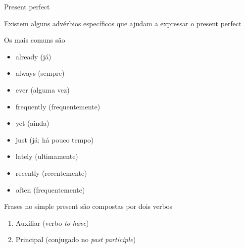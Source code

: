 \documentclass[compress,mathserif,xcolor=table]{beamer}
\begin{document}
\begin{frame}{Present perfect}

Existem alguns advérbios específicos que ajudam a expressar o present perfect

Os mais comuns são

\begin{minipage}{.49\textwidth}
\begin{itemize}
    \item already (já)
    \item always (sempre)
    \item ever (alguma vez)
    \item frequently (frequentemente)
    \item yet (ainda)
\end{itemize}
\end{minipage}
\begin{minipage}{.49\textwidth}
\begin{itemize}
    \item just (já; há pouco tempo) 
    \item lately (ultimamente)
    \item recently (recentemente)
    \item often (frequentemente)
\end{itemize}
\end{minipage}

\vspace{0.5cm}

Frases no simple present são compostas por dois verbos
\begin{enumerate}
    \item Auxiliar (verbo \textit{to have})
    \item Principal (conjugado no \textit{past participle})
\end{enumerate}

\end{frame}

\end{document}
